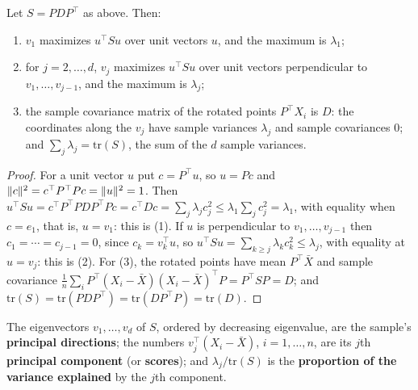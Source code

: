 \begin{theorem}
\label{thm:pca-directions}
Let $S = PDP^\top$ as above. Then:
\begin{enumerate}[nosep]
\item $v_1$ maximizes $u^\top Su$ over unit vectors $u$, and the maximum is $\lambda_1$;
\item for $j = 2, \ldots, d$, $v_j$ maximizes $u^\top Su$ over unit vectors perpendicular to $v_1, \ldots, v_{j-1}$, and the maximum is $\lambda_j$;
\item the sample covariance matrix of the rotated points $P^\top X_i$ is $D$: the coordinates along the $v_j$ have sample variances $\lambda_j$ and sample covariances $0$; and $\sum_j\lambda_j = \mathrm{tr}(S)$, the sum of the $d$ sample variances.
\end{enumerate}
\end{theorem}
\begin{proof}
For a unit vector $u$ put $c = P^\top u$, so $u = Pc$ and $\lVert c\rVert^2 = c^\top P^\top Pc = \lVert u\rVert^2 = 1$.
Then $u^\top Su = c^\top P^\top PDP^\top Pc = c^\top Dc = \sum_j\lambda_jc_j^2 \leq \lambda_1\sum_jc_j^2 = \lambda_1$, with equality when $c = e_1$, that is, $u = v_1$: this is (1).
If $u$ is perpendicular to $v_1, \ldots, v_{j-1}$ then $c_1 = \cdots = c_{j-1} = 0$, since $c_k = v_k^\top u$, so $u^\top Su = \sum_{k \geq j}\lambda_kc_k^2 \leq \lambda_j$, with equality at $u = v_j$: this is (2).
For (3), the rotated points have mean $P^\top\bar{X}$ and sample covariance $\frac1n\sum_iP^\top(X_i - \bar{X})(X_i - \bar{X})^\top P = P^\top SP = D$; and $\mathrm{tr}(S) = \mathrm{tr}(PDP^\top) = \mathrm{tr}(DP^\top P) = \mathrm{tr}(D)$.
\end{proof}

\begin{definition}
\label{def:pca}
The eigenvectors $v_1, \ldots, v_d$ of $S$, ordered by decreasing eigenvalue, are the sample's \textbf{principal directions}; the numbers $v_j^\top(X_i - \bar{X})$, $i = 1, \ldots, n$, are its $j$th \textbf{principal component} (or \textbf{scores}); and $\lambda_j/\mathrm{tr}(S)$ is the \textbf{proportion of the variance explained} by the $j$th component.
\end{definition}

